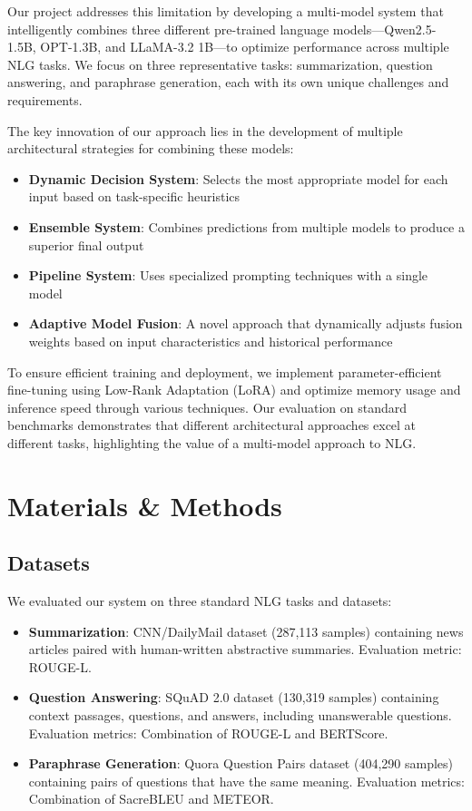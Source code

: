 \documentclass[10pt,twocolumn,letterpaper]{article}
\begin{document}
Our project addresses this limitation by developing a multi-model system that intelligently combines three different pre-trained language models—Qwen2.5-1.5B, OPT-1.3B, and LLaMA-3.2 1B—to optimize performance across multiple NLG tasks. We focus on three representative tasks: summarization, question answering, and paraphrase generation, each with its own unique challenges and requirements.

The key innovation of our approach lies in the development of multiple architectural strategies for combining these models:
\begin{itemize}
    \item \textbf{Dynamic Decision System}: Selects the most appropriate model for each input based on task-specific heuristics
    \item \textbf{Ensemble System}: Combines predictions from multiple models to produce a superior final output
    \item \textbf{Pipeline System}: Uses specialized prompting techniques with a single model
    \item \textbf{Adaptive Model Fusion}: A novel approach that dynamically adjusts fusion weights based on input characteristics and historical performance
\end{itemize}

To ensure efficient training and deployment, we implement parameter-efficient fine-tuning using Low-Rank Adaptation (LoRA) and optimize memory usage and inference speed through various techniques. Our evaluation on standard benchmarks demonstrates that different architectural approaches excel at different tasks, highlighting the value of a multi-model approach to NLG.

\section{Materials \& Methods}

\subsection{Datasets}

We evaluated our system on three standard NLG tasks and datasets:

\begin{itemize}
    \item \textbf{Summarization}: CNN/DailyMail dataset (287,113 samples) containing news articles paired with human-written abstractive summaries. Evaluation metric: ROUGE-L.
    
    \item \textbf{Question Answering}: SQuAD 2.0 dataset (130,319 samples) containing context passages, questions, and answers, including unanswerable questions. Evaluation metrics: Combination of ROUGE-L and BERTScore.
    
    \item \textbf{Paraphrase Generation}: Quora Question Pairs dataset (404,290 samples) containing pairs of questions that have the same meaning. Evaluation metrics: Combination of SacreBLEU and METEOR.
\end{itemize}
\end{document}
